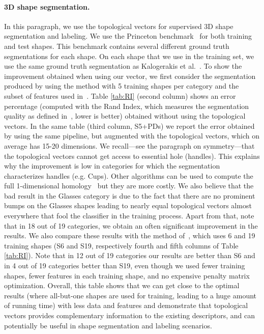 \paragraph*{3D shape segmentation.}
In this paragraph, we use the topological vectors for supervised 3D
shape segmentation and labeling.
We use the Princeton benchmark~\cite{Chen09} for both training and test shapes. This benchmark
contains several different ground truth segmentations for each shape. On each shape that we use in
the training set, we use the same ground truth segmentation as Kalogerakis et
al.~\cite{Kalogerakis10}. 
To show the improvement obtained when using our vector, we first consider the segmentation
produced by using the method with 5 training shapes per category and the subset of
features used in~\cite{Kalogerakis10}. Table \ref{tab:RI} (second column) shows an error percentage (computed with the Rand Index, 
which measures the segmentation quality as defined in~\cite{Chen09}, lower is better) obtained without using the topological vectors. 
In the same table (third column, S5+PDs) 
we report the error obtained by using the same
pipeline, but augmented with the topological vectors, which on average has 15-20 dimensions.
We recall---see the paragraph on symmetry---that the topological vectors cannot get access to essential hole (handles).
This explains why the improvement is low in categories for which the segmentation characterizes handles (e.g. Cups).
Other algorithms can be used to compute the full 1-dimensional homology~\cite{Morozov08} but they are more costly.
We also believe that the bad result in the Glasses category is due to the fact that there are no
prominent bumps on the Glasses shapes leading to nearly equal topological vectors almost everywhere that fool
the classifier in the training process.
Apart from that, note that in 18 out of 19 categories, we obtain an often significant improvement in the results. We also compare
these results with the method of~\cite{Kalogerakis10}, which uses 6 and 19 training shapes (S6
and S19, respectively fourth and fifth columns of Table \ref{tab:RI}). Note that in 12 out of 19
categories our results are better than S6 and in 4 out of 19 categories better than S19, even though we
used fewer training shapes, fewer features in each training shape, and no expensive penalty matrix optimization.  
Overall, this table shows that we can get close to the optimal results (where all-but-one shapes are used for training,
leading to a huge amount of running time) with 
less data and features and demonstrate that topological vectors provides complementary information to the
existing descriptors, and can potentially be useful in shape segmentation and labeling scenarios.

